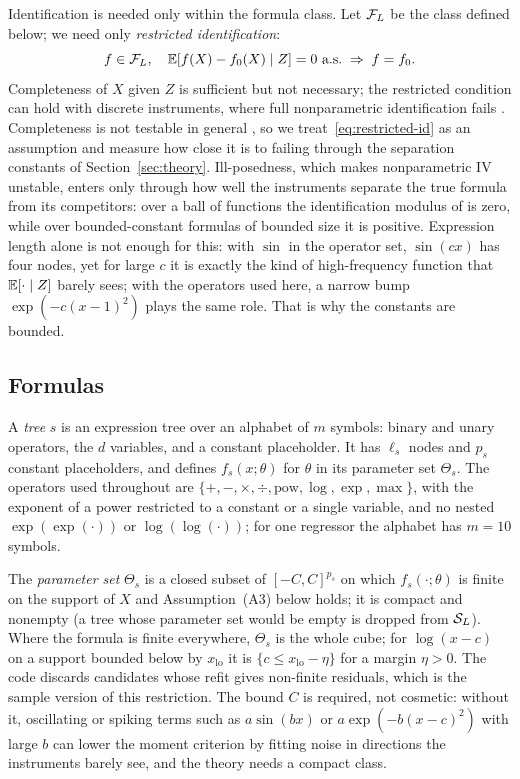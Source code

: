 Identification is needed only within the formula class. Let $\mathcal{F}_L$ be the class defined below; we need only \emph{restricted identification}:
\begin{equation}
f \in \mathcal{F}_L, \quad \mathbb{E}[f(X) - f_0(X) \mid Z] = 0 \text{ a.s.} \;\Rightarrow\; f = f_0.
\label{eq:restricted-id}
\end{equation}
Completeness of $X$ given $Z$ \citep{dhaultfoeuille2011} is sufficient but not necessary; the restricted condition can hold with discrete instruments, where full nonparametric identification fails \citep{freybergerhorowitz2015}. Completeness is not testable in general \citep{canaysantosshaikh2013}, so we treat~\eqref{eq:restricted-id} as an assumption and measure how close it is to failing through the separation constants of Section~\ref{sec:theory}. Ill-posedness, which makes nonparametric IV unstable, enters only through how well the instruments separate the true formula from its competitors: over a ball of functions the identification modulus of  is zero, while over bounded-constant formulas of bounded size it is positive. Expression length alone is not enough for this: with $\sin$ in the operator set, $\sin(cx)$ has four nodes, yet for large $c$ it is exactly the kind of high-frequency function that $\mathbb{E}[\cdot \mid Z]$ barely sees; with the operators used here, a narrow bump $\exp(-c(x - 1)^2)$ plays the same role. That is why the constants are bounded.

\subsection{Formulas}
\label{sec:formulas}

A \emph{tree} $s$ is an expression tree over an alphabet of $m$ symbols: binary and unary operators, the $d$ variables, and a constant placeholder. It has $\ell_s$ nodes and $p_s$ constant placeholders, and defines $f_s(x;\theta)$ for $\theta$ in its parameter set $\Theta_s$. The operators used throughout are $\{+, -, \times, \div, \mathrm{pow}, \log, \exp, \max\}$, with the exponent of a power restricted to a constant or a single variable, and no nested $\exp(\exp(\cdot))$ or $\log(\log(\cdot))$; for one regressor the alphabet has $m = 10$ symbols.

The \emph{parameter set} $\Theta_s$ is a closed subset of $[-C, C]^{p_s}$ on which $f_s(\cdot;\theta)$ is finite on the support of $X$ and Assumption~(A3) below holds; it is compact and nonempty (a tree whose parameter set would be empty is dropped from $\mathcal{S}_L$). Where the formula is finite everywhere, $\Theta_s$ is the whole cube; for $\log(x - c)$ on a support bounded below by $x_{\mathrm{lo}}$ it is $\{c \le x_{\mathrm{lo}} - \eta\}$ for a margin $\eta > 0$. The code discards candidates whose refit gives non-finite residuals, which is the sample version of this restriction. The bound $C$ is required, not cosmetic: without it, oscillating or spiking terms such as $a\sin(bx)$ or $a\exp(-b(x - c)^2)$ with large $b$ can lower the moment criterion by fitting noise in directions the instruments barely see, and the theory needs a compact class.

